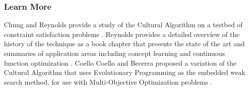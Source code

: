 % 
% 
\subsubsection{Learn More}
Chung and Reynolds provide a study of the Cultural Algorithm on a testbed of constraint satisfaction problems \cite{Chung1996}.
Reynolds provides a detailed overview of the history of the technique as a book chapter that presents the state of the art and summaries of application areas including concept learning and continuous function optimization \cite{Reynolds1999}.
Coello Coello and Becerra proposed a variation of the Cultural Algorithm that uses Evolutionary Programming as the embedded weak search method, for use with Multi-Objective Optimization problems \cite{CoelloCoello2003}.


